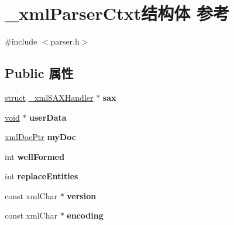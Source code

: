 \hypertarget{struct__xml_parser_ctxt}{}\section{\+\_\+xml\+Parser\+Ctxt结构体 参考}
\label{struct__xml_parser_ctxt}


{\ttfamily \#include $<$parser.\+h$>$}

\subsection*{Public 属性}
\begin{DoxyCompactItemize}
\item 
\mbox{\label{struct__xml_parser_ctxt_a6461422cb3f71bd1eeea538a7c72b56e}} 
\hyperlink{interfacestruct}{struct} \hyperlink{struct__xml_s_a_x_handler}{\+\_\+xml\+S\+A\+X\+Handler} $\ast$ {\bfseries sax}
\item 
\mbox{\label{struct__xml_parser_ctxt_ae23873a107a9dc280a0a4daba0f21671}} 
\hyperlink{interfacevoid}{void} $\ast$ {\bfseries user\+Data}
\item 
\mbox{\label{struct__xml_parser_ctxt_a7058431b5a7781f3ecb400a0687b35de}} 
\hyperlink{struct__xml_doc}{xml\+Doc\+Ptr} {\bfseries my\+Doc}
\item 
\mbox{\label{struct__xml_parser_ctxt_a304fdc65a808cab0e5057770375d1809}} 
int {\bfseries well\+Formed}
\item 
\mbox{\label{struct__xml_parser_ctxt_a1649ee3fa54a9a0a666f82c5738faf80}} 
int {\bfseries replace\+Entities}
\item 
\mbox{\label{struct__xml_parser_ctxt_ac3b0f4294a275545b1305218d90d02ea}} 
const xml\+Char $\ast$ {\bfseries version}
\item 
\mbox{\label{struct__xml_parser_ctxt_a8ab949233a869865002ede3ef6c1a452}} 
const xml\+Char $\ast$ {\bfseries encoding}
\item 
\mbox{\label{struct__xml_parser_ctxt_ad92c2a15082cf72806f8b6499b12b4d5}} 

\end{DoxyCompactItemize}

